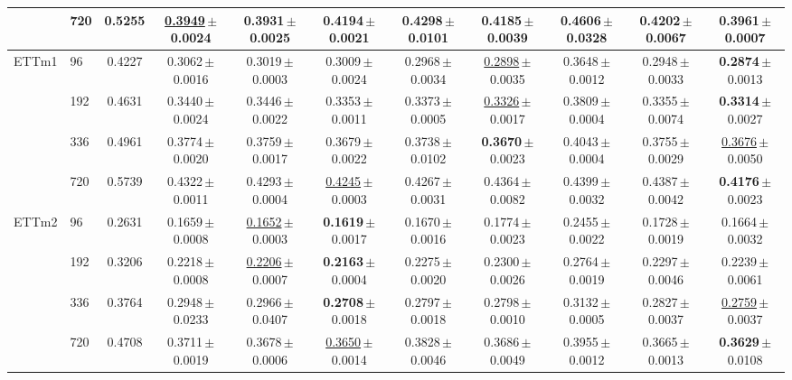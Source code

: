 \begin{tabular}{llccccccccc}
 & 720 & 0.5255 & \underline{0.3949}\,{\tiny$\pm$0.0024} & \textbf{0.3931}\,{\tiny$\pm$0.0025} & 0.4194\,{\tiny$\pm$0.0021} & 0.4298\,{\tiny$\pm$0.0101} & 0.4185\,{\tiny$\pm$0.0039} & 0.4606\,{\tiny$\pm$0.0328} & 0.4202\,{\tiny$\pm$0.0067} & 0.3961\,{\tiny$\pm$0.0007} \\
\midrule
\multirow{4}{*}{ETTm1} & 96 & 0.4227 & 0.3062\,{\tiny$\pm$0.0016} & 0.3019\,{\tiny$\pm$0.0003} & 0.3009\,{\tiny$\pm$0.0024} & 0.2968\,{\tiny$\pm$0.0034} & \underline{0.2898}\,{\tiny$\pm$0.0035} & 0.3648\,{\tiny$\pm$0.0012} & 0.2948\,{\tiny$\pm$0.0033} & \textbf{0.2874}\,{\tiny$\pm$0.0013} \\
 & 192 & 0.4631 & 0.3440\,{\tiny$\pm$0.0024} & 0.3446\,{\tiny$\pm$0.0022} & 0.3353\,{\tiny$\pm$0.0011} & 0.3373\,{\tiny$\pm$0.0005} & \underline{0.3326}\,{\tiny$\pm$0.0017} & 0.3809\,{\tiny$\pm$0.0004} & 0.3355\,{\tiny$\pm$0.0074} & \textbf{0.3314}\,{\tiny$\pm$0.0027} \\
 & 336 & 0.4961 & 0.3774\,{\tiny$\pm$0.0020} & 0.3759\,{\tiny$\pm$0.0017} & 0.3679\,{\tiny$\pm$0.0022} & 0.3738\,{\tiny$\pm$0.0102} & \textbf{0.3670}\,{\tiny$\pm$0.0023} & 0.4043\,{\tiny$\pm$0.0004} & 0.3755\,{\tiny$\pm$0.0029} & \underline{0.3676}\,{\tiny$\pm$0.0050} \\
 & 720 & 0.5739 & 0.4322\,{\tiny$\pm$0.0011} & 0.4293\,{\tiny$\pm$0.0004} & \underline{0.4245}\,{\tiny$\pm$0.0003} & 0.4267\,{\tiny$\pm$0.0031} & 0.4364\,{\tiny$\pm$0.0082} & 0.4399\,{\tiny$\pm$0.0032} & 0.4387\,{\tiny$\pm$0.0042} & \textbf{0.4176}\,{\tiny$\pm$0.0023} \\
\midrule
\multirow{4}{*}{ETTm2} & 96 & 0.2631 & 0.1659\,{\tiny$\pm$0.0008} & \underline{0.1652}\,{\tiny$\pm$0.0003} & \textbf{0.1619}\,{\tiny$\pm$0.0017} & 0.1670\,{\tiny$\pm$0.0016} & 0.1774\,{\tiny$\pm$0.0023} & 0.2455\,{\tiny$\pm$0.0022} & 0.1728\,{\tiny$\pm$0.0019} & 0.1664\,{\tiny$\pm$0.0032} \\
 & 192 & 0.3206 & 0.2218\,{\tiny$\pm$0.0008} & \underline{0.2206}\,{\tiny$\pm$0.0007} & \textbf{0.2163}\,{\tiny$\pm$0.0004} & 0.2275\,{\tiny$\pm$0.0020} & 0.2300\,{\tiny$\pm$0.0026} & 0.2764\,{\tiny$\pm$0.0019} & 0.2297\,{\tiny$\pm$0.0046} & 0.2239\,{\tiny$\pm$0.0061} \\
 & 336 & 0.3764 & 0.2948\,{\tiny$\pm$0.0233} & 0.2966\,{\tiny$\pm$0.0407} & \textbf{0.2708}\,{\tiny$\pm$0.0018} & 0.2797\,{\tiny$\pm$0.0018} & 0.2798\,{\tiny$\pm$0.0010} & 0.3132\,{\tiny$\pm$0.0005} & 0.2827\,{\tiny$\pm$0.0037} & \underline{0.2759}\,{\tiny$\pm$0.0037} \\
 & 720 & 0.4708 & 0.3711\,{\tiny$\pm$0.0019} & 0.3678\,{\tiny$\pm$0.0006} & \underline{0.3650}\,{\tiny$\pm$0.0014} & 0.3828\,{\tiny$\pm$0.0046} & 0.3686\,{\tiny$\pm$0.0049} & 0.3955\,{\tiny$\pm$0.0012} & 0.3665\,{\tiny$\pm$0.0013} & \textbf{0.3629}\,{\tiny$\pm$0.0108} \\

\end{tabular}
